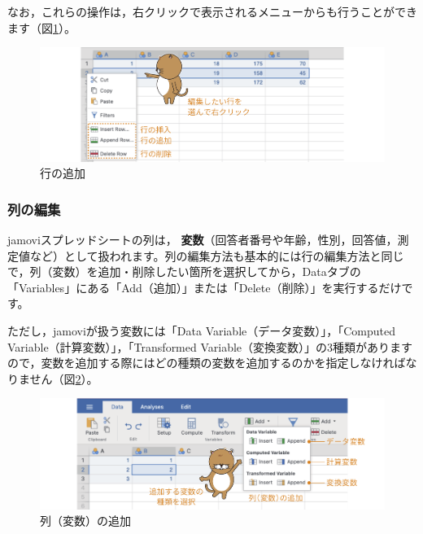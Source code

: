 \documentclass[
  12pt,
  a5jpaper,
  lualatex, ja=standard]{bxjsbook}
\renewcommand{\emph}[1]{\textbf{\color{emph} #1}}
\begin{document}
なお，これらの操作は，右クリックで表示されるメニューからも行うことができます（図\ref{fig:add-row-submenu}）。

\begin{figure}[!ht]

{\centering \includegraphics[width=1\linewidth]{images/basics/add-row-submenu} 

}

\caption{行の追加}\label{fig:add-row-submenu}
\end{figure}

\hypertarget{ux5217ux306eux7de8ux96c6}{%
\subsubsection*{列の編集}\label{ux5217ux306eux7de8ux96c6}}

jamoviスプレッドシートの列は，\emph{変数}（回答者番号や年齢，性別，回答値，測定値など）として扱われます。列の編集方法も基本的には行の編集方法と同じで，列（変数）を追加・削除したい箇所を選択してから，Dataタブの「Variables」にある「Add（追加）」または「Delete（削除）」を実行するだけです。

ただし，jamoviが扱う変数には「Data Variable（データ変数）」，「Computed Variable（計算変数）」，「Transformed Variable（変換変数）」の3種類がありますので，変数を追加する際にはどの種類の変数を追加するのかを指定しなければなりません（図\ref{fig:edit-col-add}）。

\begin{figure}[!ht]

{\centering \includegraphics[width=1\linewidth]{images/basics/edit-col-add} 

}

\caption{列（変数）の追加}\label{fig:edit-col-add}
\end{figure}
\end{document}
